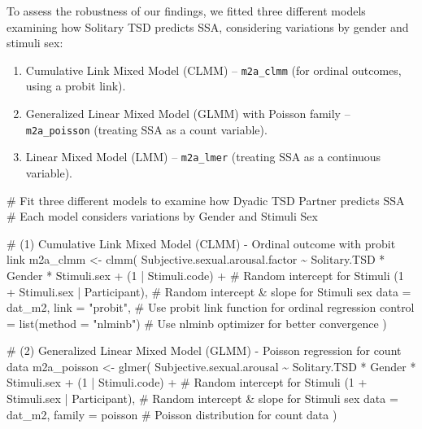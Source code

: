 \documentclass[
  bookmarksnumbered]{article}
\newenvironment{Shaded}{\begin{snugshade}}{\end{snugshade}}
\newcommand{\AttributeTok}[1]{\textcolor[rgb]{0.80,0.80,0.80}{#1}}
\newcommand{\CommentTok}[1]{\textcolor[rgb]{0.50,0.62,0.50}{#1}}
\newcommand{\DecValTok}[1]{\textcolor[rgb]{0.86,0.86,0.80}{#1}}
\newcommand{\FunctionTok}[1]{\textcolor[rgb]{0.94,0.94,0.56}{#1}}
\newcommand{\NormalTok}[1]{\textcolor[rgb]{0.80,0.80,0.80}{#1}}
\newcommand{\OtherTok}[1]{\textcolor[rgb]{0.94,0.94,0.56}{#1}}
\newcommand{\SpecialCharTok}[1]{\textcolor[rgb]{0.86,0.64,0.64}{#1}}
\newcommand{\StringTok}[1]{\textcolor[rgb]{0.80,0.58,0.58}{#1}}
\providecommand{\tightlist}{%
  \setlength{\itemsep}{0pt}\setlength{\parskip}{0pt}}
\begin{document}
To assess the robustness of our findings, we fitted three different models examining how Solitary TSD predicts SSA, considering variations by gender and stimuli sex:

\begin{enumerate}
\def\labelenumi{\arabic{enumi}.}
\tightlist
\item
  Cumulative Link Mixed Model (CLMM) -- \texttt{m2a\_clmm} (for ordinal outcomes, using a probit link).
\item
  Generalized Linear Mixed Model (GLMM) with Poisson family -- \texttt{m2a\_poisson} (treating SSA as a count variable).
\item
  Linear Mixed Model (LMM) -- \texttt{m2a\_lmer} (treating SSA as a continuous variable).
\end{enumerate}

\begin{Shaded}
\begin{Highlighting}[]
\CommentTok{\# Fit three different models to examine how Dyadic TSD Partner predicts SSA}
\CommentTok{\# Each model considers variations by Gender and Stimuli Sex}

\CommentTok{\# (1) Cumulative Link Mixed Model (CLMM) {-} Ordinal outcome with probit link}
\NormalTok{m2a\_clmm }\OtherTok{\textless{}{-}} \FunctionTok{clmm}\NormalTok{(}
\NormalTok{  Subjective.sexual.arousal.factor }\SpecialCharTok{\textasciitilde{}}\NormalTok{ Solitary.TSD }\SpecialCharTok{*}\NormalTok{ Gender }\SpecialCharTok{*}\NormalTok{ Stimuli.sex }\SpecialCharTok{+}
\NormalTok{    (}\DecValTok{1} \SpecialCharTok{|}\NormalTok{ Stimuli.code) }\SpecialCharTok{+} \CommentTok{\# Random intercept for Stimuli}
\NormalTok{    (}\DecValTok{1} \SpecialCharTok{+}\NormalTok{ Stimuli.sex }\SpecialCharTok{|}\NormalTok{ Participant), }\CommentTok{\# Random intercept \& slope for Stimuli sex}
  \AttributeTok{data =}\NormalTok{ dat\_m2,}
  \AttributeTok{link =} \StringTok{"probit"}\NormalTok{, }\CommentTok{\# Use probit link function for ordinal regression}
  \AttributeTok{control =} \FunctionTok{list}\NormalTok{(}\AttributeTok{method =} \StringTok{"nlminb"}\NormalTok{) }\CommentTok{\# Use \textquotesingle{}nlminb\textquotesingle{} optimizer for better convergence}
\NormalTok{)}

\CommentTok{\# (2) Generalized Linear Mixed Model (GLMM) {-} Poisson regression for count data}
\NormalTok{m2a\_poisson }\OtherTok{\textless{}{-}} \FunctionTok{glmer}\NormalTok{(}
\NormalTok{  Subjective.sexual.arousal }\SpecialCharTok{\textasciitilde{}}\NormalTok{ Solitary.TSD }\SpecialCharTok{*}\NormalTok{ Gender }\SpecialCharTok{*}\NormalTok{ Stimuli.sex }\SpecialCharTok{+}
\NormalTok{    (}\DecValTok{1} \SpecialCharTok{|}\NormalTok{ Stimuli.code) }\SpecialCharTok{+} \CommentTok{\# Random intercept for Stimuli}
\NormalTok{    (}\DecValTok{1} \SpecialCharTok{+}\NormalTok{ Stimuli.sex }\SpecialCharTok{|}\NormalTok{ Participant), }\CommentTok{\# Random intercept \& slope for Stimuli sex}
  \AttributeTok{data =}\NormalTok{ dat\_m2,}
  \AttributeTok{family =}\NormalTok{ poisson }\CommentTok{\# Poisson distribution for count data}
\NormalTok{)}


\end{Highlighting}
\end{Shaded}
\end{document}

